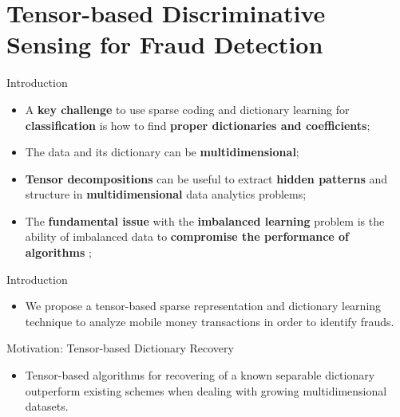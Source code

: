 \documentclass[newPxFont, numfooter, sectionpages]{beamer}
\begin{document}
%
%
\section{Tensor-based Discriminative Sensing for Fraud Detection}
\begin{frame}[c]{Introduction}
	\begin{itemize}
		\item A \textbf{key challenge} to use sparse coding and dictionary learning for \textbf{classification} is how to find \textbf{proper dictionaries and coefficients};
		\item The data and its dictionary can be \textbf{multidimensional};
		\item \textbf{Tensor decompositions} can be useful to extract \textbf{hidden patterns} and structure in \textbf{multidimensional} data analytics problems;
		\item The \textbf{fundamental issue} with the \textbf{imbalanced learning} problem is the ability of imbalanced data to \textbf{compromise the performance of algorithms} \cite{he2009learning};
	\end{itemize}
\end{frame}
\begin{frame}[c]{Introduction}
	\begin{itemize}
		\item We propose a tensor-based sparse representation and dictionary learning technique to analyze mobile money transactions in order to identify frauds.
	\end{itemize}
\end{frame}
\begin{frame}[c]{Motivation: Tensor-based Dictionary Recovery}
	\begin{itemize}
		\item Tensor-based algorithms for recovering of a known separable dictionary outperform existing schemes when dealing with growing multidimensional datasets.
	\end{itemize}
\end{frame}
\end{document}
